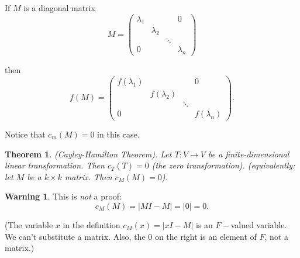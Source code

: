 \documentclass{article}
\newtheorem{theorem}{Theorem}
\theoremstyle{definition} \newtheorem*{definition}{Definition}
\newtheorem*{warning}{Warning}
\begin{document}
  \begin{remark}
    If $M$ is a diagonal matrix 
    \[
      M = \left( 
      \begin{matrix}
        \lambda_1 & & & 0\\
                  &\lambda_2 & & \\
                 &  & \ddots & \\
        0 & & & \lambda_n
      \end{matrix}
      \right)
    \]

    then
    \[
      f(M) = \left( 
      \begin{matrix}
        f(\lambda_1) & & & 0\\
                  &f(\lambda_2) & & \\
                 &  & \ddots & \\
        0 & & & f(\lambda_n)
      \end{matrix}
      \right).
    \]

    Notice that $c_m(M) = 0$ in this case.\\
  \end{remark}

  \begin{theorem}
    (Cayley-Hamilton Theorem). Let $T:V \rightarrow V$ be a
    finite-dimensional linear
    transformation. Then $c_T(T) = 0$ (the zero transformation).
    (equivalently: let $M$ be a $k \times k$ matrix. Then $c_M(M)=0$).\\
    \label{thm:cht}
  \end{theorem}

  \begin{warning}
    This is \emph{not} a proof:
    \[
      c_M(M) = |MI - M| = |0| = 0.
    \]

    (The variable $x$ in the definition $c_M(x)=|xI - M|$ is an $F-$valued
    variable. We can't substitute a matrix. Also, the 0 on the right is an
    element of $F$, not a matrix.)
  \end{warning}
\end{document}
